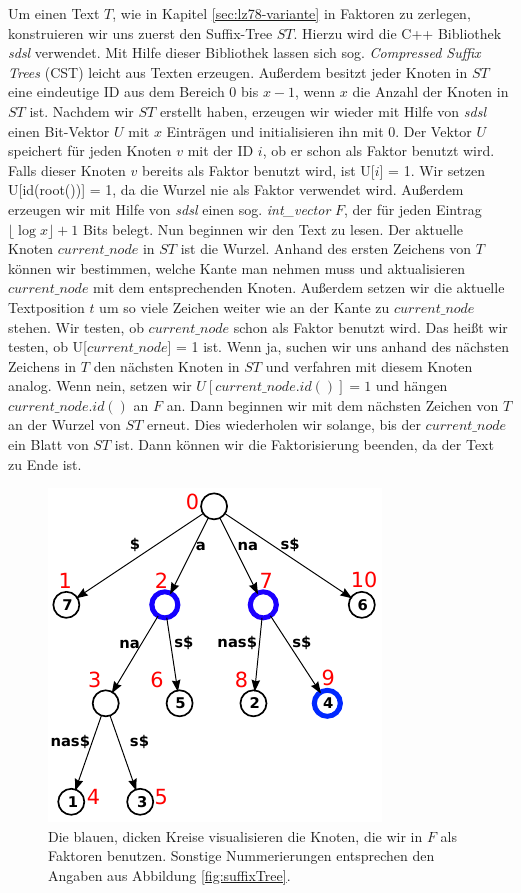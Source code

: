 \documentclass[a4paper,11pt]{scrartcl}%
\theoremstyle{change}
\theoremstyle{nonumberplain}
\theoremstyle{change}
\theoremstyle{nonumberplain}
\theoremstyle{change}
\theoremstyle{nonumberplain}
\begin{document}
		Um einen Text $T$, wie in Kapitel \ref{sec:lz78-variante} in Faktoren zu zerlegen, konstruieren wir uns zuerst den Suffix-Tree $ST$. Hierzu wird die C++ Bibliothek \textit{sdsl} verwendet. Mit Hilfe dieser Bibliothek lassen sich sog. \textit{Compressed Suffix Trees} (CST) leicht aus Texten erzeugen. Außerdem besitzt jeder Knoten in $ST$ eine eindeutige ID aus dem Bereich 0 bis $x-1$, wenn $x$ die Anzahl der Knoten in $ST$ ist. Nachdem wir $ST$ erstellt haben, erzeugen wir wieder mit Hilfe von \textit{sdsl} einen Bit-Vektor $U$ mit $x$ Einträgen und initialisieren ihn mit 0. Der Vektor $U$ speichert für jeden Knoten $v$ mit der ID $i$, ob er schon als Faktor benutzt wird. Falls dieser Knoten $v$ bereits als Faktor benutzt wird, ist U[$i$] = 1. Wir setzen U[id(root())] = 1, da die Wurzel nie als Faktor verwendet wird. Außerdem erzeugen wir mit Hilfe von \textit{sdsl} einen sog. \textit{int\_vector} $F$, der für jeden Eintrag $\lfloor\log x\rfloor + 1$ Bits belegt.
		Nun beginnen wir den Text zu lesen. Der aktuelle Knoten $current\_node$ in $ST$ ist die Wurzel. Anhand des ersten Zeichens von $T$ können wir bestimmen, welche Kante man nehmen muss und aktualisieren $current\_node$ mit dem entsprechenden Knoten. Außerdem setzen wir die aktuelle Textposition $t$ um so viele Zeichen weiter wie an der Kante zu $current\_node$ stehen. Wir testen, ob $current\_node$ schon als Faktor benutzt wird. Das heißt wir testen, ob U[$current\_node$] = 1 ist. Wenn ja, suchen wir uns anhand des nächsten Zeichens in $T$ den nächsten Knoten in $ST$ und verfahren mit diesem Knoten analog.
		Wenn nein, setzen wir $U[current\_node.id()] = 1$ und hängen $current\_node.id()$ an $F$ an. Dann beginnen wir mit dem nächsten Zeichen von $T$ an der Wurzel von $ST$ erneut. Dies wiederholen wir solange, bis der $current\_node$ ein Blatt von $ST$ ist. Dann können wir die Faktorisierung beenden, da der Text zu Ende ist.
		\begin{figure}[h]
			\centering
			\includegraphics[scale=0.8]{./pics/ananas_suffixTree_inorder_markiert}
			\caption{Die blauen, dicken Kreise visualisieren die Knoten, die wir in $F$ als Faktoren benutzen. Sonstige Nummerierungen entsprechen den Angaben aus Abbildung \ref{fig:suffixTree}.}
			\label{fig:st_inorder}
		\end{figure}
\end{document}
